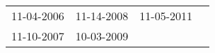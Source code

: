 \begin{supertabular}{llll}
 11-04-2006 &  11-14-2008 &  11-05-2011 \\
 11-10-2007 &  10-03-2009 &             \\
\end{supertabular}
